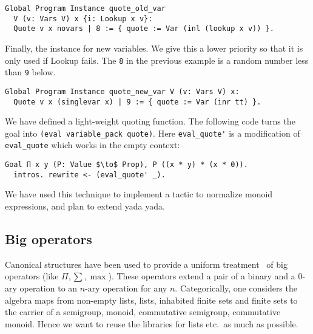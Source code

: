 \documentclass[a4paper,10pt,runningheads]{llncs}
\begin{document}
\begin{lstlisting}
Global Program Instance quote_old_var
  V (v: Vars V) x {i: Lookup x v}:
  Quote v x novars | 8 := { quote := Var (inl (lookup x v)) }.
\end{lstlisting}


\noindent Finally, the instance for new variables. We give this a lower priority so that it is only
used if Lookup fails. The \lstinline|8| in the previous example is a random number less than \lstinline|9| below. 

\begin{lstlisting}
Global Program Instance quote_new_var V (v: Vars V) x:
  Quote v x (singlevar x) | 9 := { quote := Var (inr tt) }.
\end{lstlisting}


We have defined a light-weight quoting function. The following code turns the goal into \lstinline|(eval variable_pack quote)|.
Here \lstinline|eval_quote'| is a modification of \lstinline|eval_quote| which works in the empty context:
\begin{lstlisting}
Goal Π x y (P: Value $\to$ Prop), P ((x * y) * (x * 0)).
  intros. rewrite <- (eval_quote' _).
\end{lstlisting}

We have used this technique to implement a tactic to normalize monoid expressions, and plan to extend yada yada.


\subsection{Big operators}
Canonical structures have been used to provide a uniform treatment~\cite{bertot2008canonical} of big
operators (like $\Pi,\sum, \max$). These operators extend a pair of a binary and a 0-ary operation
to an $n$-ary operation for any $n$. Categorically, one considers the algebra maps from non-empty
lists, lists, inhabited finite sets and finite sets to the carrier of a semigroup, monoid,
commutative semigroup, commutative monoid. Hence we want to reuse the libraries for lists etc.\ as much as possible.
\end{document}
